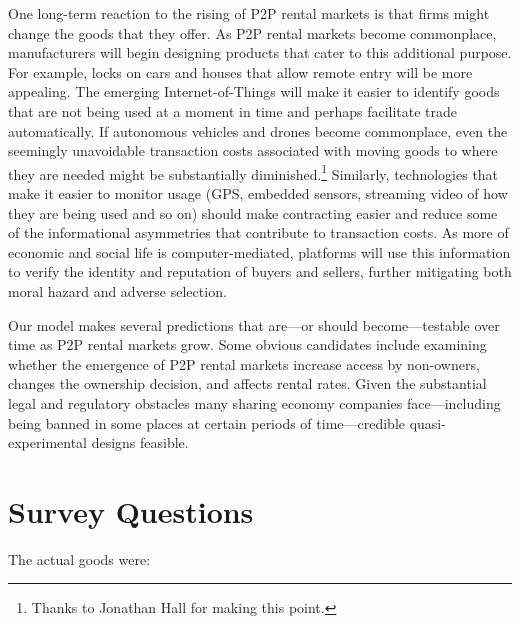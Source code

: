\documentclass[11pt]{article}
\begin{document}
One long-term reaction to the rising of P2P rental markets is that firms might change the goods that they offer. 
As P2P rental markets become commonplace, manufacturers will begin designing products that cater to this additional purpose. 
For example, locks on cars and houses that allow remote entry will be more appealing. 
The emerging Internet-of-Things will make it easier to identify goods that are not being used at a moment in time and perhaps facilitate trade automatically.
If autonomous vehicles and drones become commonplace, even the seemingly unavoidable transaction costs associated with moving goods to where they are needed might be substantially diminished.\footnote{
  Thanks to Jonathan Hall for making this point.
}
Similarly, technologies that make it easier to monitor usage (GPS, embedded sensors, streaming video of how they are being used and so on) should make contracting easier and reduce some of the informational asymmetries that contribute to transaction costs. 
As more of economic and social life is computer-mediated, platforms will use this information to verify the identity and reputation of buyers and sellers, further mitigating both moral hazard and adverse selection.  

Our model makes several predictions that are---or should become---testable over time as P2P rental markets grow.
Some obvious candidates include examining whether the emergence of P2P rental markets increase access by non-owners, changes the ownership decision, and affects rental rates.
Given the substantial legal and regulatory obstacles many sharing economy companies face---including being banned in some places at certain periods of time---credible quasi-experimental designs feasible. 





\newpage 

\appendix 

\section{Survey Questions \label{sec:survey}} 

The actual goods were: 
\end{document}
